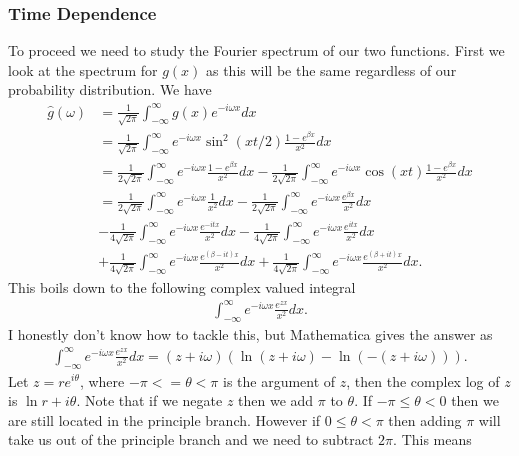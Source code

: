 \documentclass[
 amsmath,amssymb,
 aps,
onecolumn, 
nofootinbib]{revtex4-2}
\begin{document}
\subsubsection{Time Dependence}
To proceed we need to study the Fourier spectrum of our two functions. First we look at the spectrum for $g(x)$ as this will be the same regardless of our probability distribution. We have 
\begin{align}
    \hat{g}(\omega) &= \frac{1}{\sqrt{2 \pi}} \int_{-\infty}^{\infty} g(x) e^{-i \omega x} d x \\
    &= \frac{1}{\sqrt{2\pi}} \int_{-\infty}^{\infty} e^{-i \omega x} \sin^2 (x t/2) \frac{1 - e^{\beta x}}{x^2} dx \\
    &= \frac{1}{2 \sqrt{2\pi}} \int_{-\infty}^{\infty} e^{-i \omega x} \frac{1 - e^{\beta x}}{x^2} dx - \frac{1}{2 \sqrt{2\pi}} \int_{-\infty}^{\infty} e^{-i \omega x} \cos( x t)\frac{1 - e^{\beta x}}{x^2} dx \\
    &=  \frac{1}{2 \sqrt{2\pi}} \int_{-\infty}^{\infty} e^{-i \omega x} \frac{1}{x^2} dx - \frac{1}{2 \sqrt{2\pi}} \int_{-\infty}^{\infty} e^{ -i \omega x} \frac{e^{\beta x}}{x^2} dx \\
    &- \frac{1}{4 \sqrt{2\pi}} \int_{-\infty}^{\infty} e^{-i \omega x} \frac{e^{-i t x}}{x^2} dx -\frac{1}{4 \sqrt{2\pi}} \int_{-\infty}^{\infty} e^{-i \omega x} \frac{e^{i t x}}{x^2} dx \\
    &+ \frac{1}{4 \sqrt{2 \pi}} \int_{-\infty}^{\infty} e^{-i \omega x} \frac{e^{(\beta - i  t)x}}{x^2} dx + \frac{1}{4 \sqrt{2 \pi}} \int_{-\infty}^{\infty}  e^{-i \omega x} \frac{e^{(\beta + i t)x}}{x^2} dx.
\end{align}
This boils down to the following complex valued integral
\begin{align}
    \int_{-\infty}^{\infty} e^{-i \omega x} \frac{e^{z x}}{x^2} dx.
\end{align}
I honestly don't know how to tackle this, but Mathematica gives the answer as
\begin{align}
    \int_{-\infty}^{\infty} e^{-i \omega x} \frac{e^{z x}}{x^2} dx = (z + i\omega )\left(\ln (z + i\omega ) - \ln (-(z + i \omega) ) \right).
\end{align}
Let $z = r e^{i \theta}$, where $-\pi <= \theta < \pi$ is the argument of $z$, then the complex log of $z$ is $\ln r + i \theta$. Note that if we negate $z$ then we add $\pi$ to $\theta$. If $-\pi \le \theta < 0$ then we are still located in the principle branch. However if $0 \le \theta < \pi$ then adding $\pi$ will take us out of the principle branch and we need to subtract $2 \pi$. This means 
\end{document}
